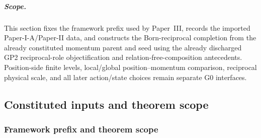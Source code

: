 \documentclass[12pt,a4paper]{article}
\begin{document}
\label{p3:part:dyn-core}

\subparagraph{Scope.} This section fixes the framework
prefix used by Paper~III, records the imported Paper-I-A/Paper-II data, and
constructs the Born-reciprocal completion from the already constituted
momentum parent and seed using the already discharged GP2 reciprocal-role
objectification and relation-free-composition antecedents.  Position-side
finite levels, local/global position--momentum comparison, reciprocal physical
scale, and all later action/state choices remain separate G0 interfaces.

\subsection{Constituted inputs and theorem scope}
\label{p3:sec:introduction}

\subsubsection{Framework prefix and theorem scope}
\label{p3:subsec:framework-prefix-status}
\end{document}
